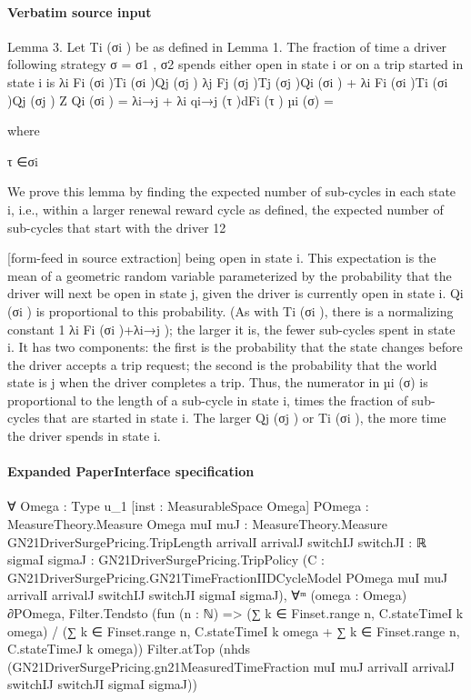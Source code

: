 \documentclass[10pt]{article}
\begin{document}
\paragraph{Verbatim source input}
\begin{ReviewVerbatim}
Lemma 3. Let Ti (σi ) be as defined in Lemma 1. The fraction of time a driver following strategy
σ = {σ1 , σ2 } spends either open in state i or on a trip started in state i is
λi Fi (σi )Ti (σi )Qj (σj )
λj Fj (σj )Tj (σj )Qi (σi ) + λi Fi (σi )Ti (σi )Qj (σj )
Z
Qi (σi ) = λi→j + λi
qi→j (τ )dFi (τ )
µi (σ) =

where

τ ∈σi

We prove this lemma by finding the expected number of sub-cycles in each state i, i.e., within a
larger renewal reward cycle as defined, the expected number of sub-cycles that start with the driver
12


[form-feed in source extraction]
being open in state i. This expectation is the mean of a geometric random variable parameterized
by the probability that the driver will next be open in state j, given the driver is currently open in
state i. Qi (σi ) is proportional to this probability. (As with Ti (σi ), there is a normalizing constant
1
λi Fi (σi )+λi→j ); the larger it is, the fewer sub-cycles spent in state i. It has two components: the
first is the probability that the state changes before the driver accepts a trip request; the second
is the probability that the world state is j when the driver completes a trip. Thus, the numerator
in µi (σ) is proportional to the length of a sub-cycle in state i, times the fraction of sub-cycles that
are started in state i. The larger Qj (σj ) or Ti (σi ), the more time the driver spends in state i.
\end{ReviewVerbatim}



\paragraph{Expanded PaperInterface specification}
\begin{ReviewVerbatim}
∀ {Omega : Type u_1} [inst : MeasurableSpace Omega] {POmega : MeasureTheory.Measure Omega}
  {muI muJ : MeasureTheory.Measure GN21DriverSurgePricing.TripLength} {arrivalI arrivalJ switchIJ switchJI : ℝ}
  {sigmaI sigmaJ : GN21DriverSurgePricing.TripPolicy}
  (C :
    GN21DriverSurgePricing.GN21TimeFractionIIDCycleModel POmega muI muJ arrivalI arrivalJ switchIJ switchJI sigmaI
      sigmaJ),
  ∀ᵐ (omega : Omega) ∂POmega,
    Filter.Tendsto
      (fun (n : ℕ) =>
        (∑ k ∈ Finset.range n, C.stateTimeI k omega) /
          (∑ k ∈ Finset.range n, C.stateTimeI k omega + ∑ k ∈ Finset.range n, C.stateTimeJ k omega))
      Filter.atTop
      (nhds (GN21DriverSurgePricing.gn21MeasuredTimeFraction muI muJ arrivalI arrivalJ switchIJ switchJI sigmaI sigmaJ))
\end{ReviewVerbatim}
\end{document}
